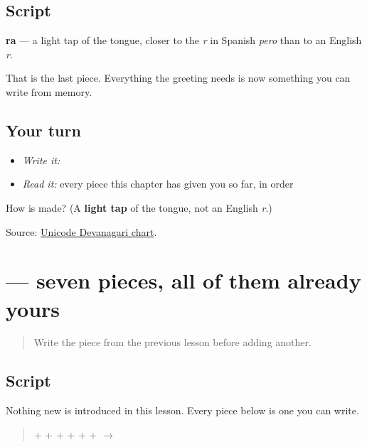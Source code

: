 \subsection*{Script}
\begin{quote}
\end{quote}

\textbf{ra} — a light tap of the tongue, closer to the \emph{r} in Spanish \emph{pero} than to an English \emph{r}.

That is the last piece. Everything the greeting needs is now something you can write from memory.

\subsection*{Your turn}
\begin{itemize}
\raggedright
  \item \emph{Write it:} 
  \item \emph{Read it:} every piece this chapter has given you so far, in order
\end{itemize}

\begin{tcolorbox}[breakable,colback=teal!4,colframe=teal!35!black,title={Before you move on}]
How is \textbf{} made? (A \textbf{light tap} of the tongue, not an English \emph{r}.)

Source: \href{https://www.unicode.org/charts/PDF/U0900.pdf}{Unicode Devanagari chart}.
\end{tcolorbox}
\section[namaskār]{ — seven pieces, all of them already yours}

\label{lesson:MR-W01-namaskar-read}



\begin{quote}
Write the piece from the previous lesson before adding another.
\end{quote}

\subsection*{Script}
Nothing new is introduced in this lesson. Every piece below is one you can write.

\begin{quote}
\textbf{} + \textbf{} + \textbf{} + \textbf{} + \textbf{} + \textbf{} + \textbf{} $\to$ \textbf{}
\end{quote}

